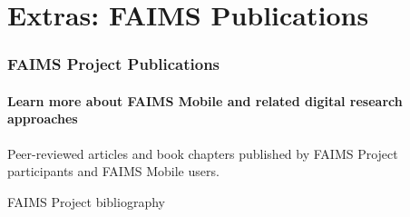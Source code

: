 
\section{Extras: FAIMS Publications}

\begin{sectionframe} %
	\frametitle{FAIMS Project Publications}
	\framesubtitle{Learn more about FAIMS Mobile and related digital research approaches}

\vfill

Peer-reviewed articles and book chapters published by FAIMS Project participants and FAIMS Mobile users.

\end{sectionframe}
\begin{frame}[allowframebreaks]{FAIMS Project bibliography}
\begin{refsegment}


\nocite{sobotkovaDeployingOfflineMultiuser2021,rossIntroducingPreregistrationResearch2020,ballsun-stantonFAIMSMobileFlexible2018,sobotkovaSociotechnicalObstaclesArchaeological2018,thorneM436DistalFootprints2018,vanvalkenburghMobilizationMediationImplementing2018,sobotkovaMeasureTwiceCut2016,rossBuildingBazaarEnhancing2015,sobotkovaArbitraryOfflineData2015a,rossCreatingEresearchTools2013a}

\printbibliography[heading=none, segment=2]

\end{refsegment}
\end{frame}
    